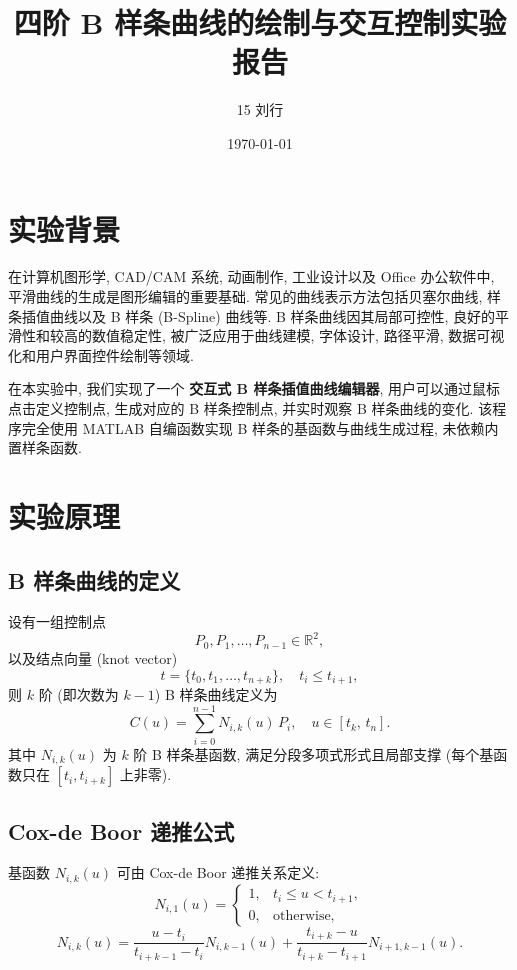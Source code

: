 \documentclass[12pt,a4paper]{article}
\title{四阶 B 样条曲线的绘制与交互控制实验报告}
\author{15 刘行}
\date{\today}
\begin{document}
    \maketitle

    \section{实验背景}
        在计算机图形学, CAD/CAM 系统, 动画制作, 工业设计以及 Office 办公软件中, 平滑曲线的生成是图形编辑的重要基础. 常见的曲线表示方法包括贝塞尔曲线, 样条插值曲线以及 B 样条 (B-Spline) 曲线等.
        B 样条曲线因其局部可控性, 良好的平滑性和较高的数值稳定性, 被广泛应用于曲线建模, 字体设计, 路径平滑, 数据可视化和用户界面控件绘制等领域.

        在本实验中, 我们实现了一个 \textbf{交互式 B 样条插值曲线编辑器}, 用户可以通过鼠标点击定义控制点, 生成对应的 B 样条控制点, 并实时观察 B 样条曲线的变化. 该程序完全使用 MATLAB 自编函数实现 B 样条的基函数与曲线生成过程, 未依赖内置样条函数.

    \section{实验原理}
        \subsection{B 样条曲线的定义}
            设有一组控制点
            \begin{equation*}
                P_0, P_1, \dots, P_{n-1} \in \mathbb{R}^2,
            \end{equation*}
            以及结点向量 (knot vector)
            \begin{equation*}
                t = \{t_0, t_1, \dots, t_{n+k}\}, \quad t_i \le t_{i+1},
            \end{equation*}
            则 $k$ 阶 (即次数为 $k-1$) B 样条曲线定义为
            \begin{equation*}
                C(u) = \sum_{i=0}^{n-1} N_{i,k}(u) \, P_i, \quad u \in [t_k,\, t_{n}].
            \end{equation*}
            其中 $N_{i,k}(u)$ 为 $k$ 阶 B 样条基函数, 满足分段多项式形式且局部支撑 (每个基函数只在 $[t_i, t_{i+k}]$ 上非零).

        \subsection{Cox-de Boor 递推公式}
            基函数 $N_{i,k}(u)$ 可由 Cox-de Boor 递推关系定义:
            \begin{equation*}
                N_{i,1}(u) =
            \begin{cases}
                1, & t_i \le u < t_{i+1}, \\
                0, & \text{otherwise,}
            \end{cases}
            \end{equation*}
            \begin{equation*}
                N_{i,k}(u) = \frac{u - t_i}{t_{i+k-1} - t_i} N_{i,k-1}(u) + \frac{t_{i+k} - u}{t_{i+k} - t_{i+1}} N_{i+1,k-1}(u).
            \end{equation*}
\end{document}
